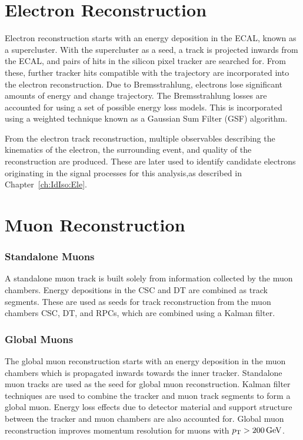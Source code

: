 \section{Electron Reconstruction}\label{ch:reco:ele}
Electron reconstruction starts with an energy deposition in the ECAL, known as a supercluster. With the supercluster as a seed, a track is projected inwards from the ECAL, and pairs of hits in the silicon pixel tracker are searched for. From these, further tracker hits compatible with the trajectory are incorporated into the electron reconstruction. Due to Bremsstrahlung, electrons lose significant amounts of energy and change trajectory. The Bremsstrahlung losses are accounted for using a set of possible energy loss models. This is incorporated using a weighted technique known as a Gaussian Sum Filter (GSF) algorithm. 

From the electron track reconstruction, multiple observables describing the kinematics of the electron, the surrounding event, and quality of the reconstruction are produced. These are later used to identify candidate electrons originating in the signal processes for this analysis,as described in Chapter~\ref{ch:IdIso:Ele}.  

\section{Muon Reconstruction}\label{ch:reco:muon}

\subsubsection{Standalone Muons}
A standalone muon track is built solely from information collected by the muon chambers. Energy depositions in the CSC and DT are combined as track segments. These are used as seeds for track reconstruction from the muon chambers CSC, DT, and RPCs, which are combined using a Kalman filter\cite{Sirunyan:2018fpa}. 

\subsubsection{Global Muons}
The global muon reconstruction starts with an energy deposition in the muon chambers which is propagated inwards towards the inner tracker. Standalone muon tracks are used as the seed for global muon reconstruction. Kalman filter techniques are used to combine the tracker and muon track segments to form a global muon. Energy loss effects due to detector material and support structure between the tracker and muon chambers are also accounted for. Global muon reconstruction improves momentum resolution for muons with $p_{\mathrm{T}} > 200 \,\text{Ge\hspace{-.08em}V}$.

